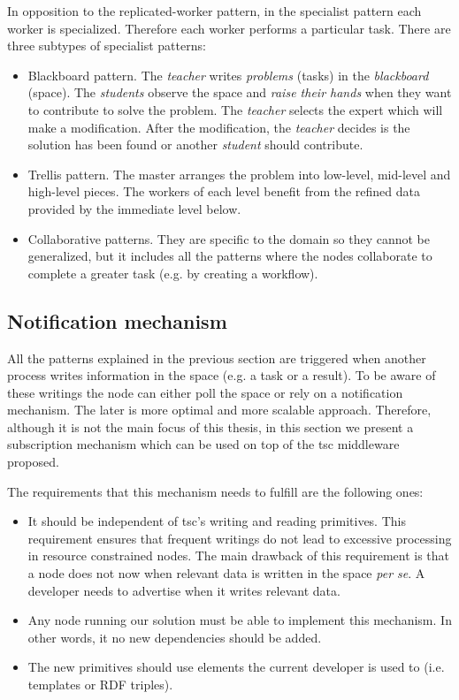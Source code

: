 In opposition to the replicated-worker pattern, in the specialist pattern each worker is specialized.
Therefore each worker performs a particular task.
There are three subtypes of specialist patterns:
\begin{itemize}
  \item Blackboard pattern.
	The \emph{teacher} writes \emph{problems} (tasks) in the \emph{blackboard} (space).
	The \emph{students} observe the space and \emph{raise their hands} when they want to contribute to solve the problem.
	The \emph{teacher} selects the expert which will make a modification.
	After the modification, the \emph{teacher} decides is the solution has been found or another \emph{student} should contribute.
  \item Trellis pattern.
	The master arranges the problem into low-level, mid-level and high-level pieces.
	The workers of each level benefit from the refined data provided by the immediate level below.
  \item Collaborative patterns.
	They are specific to the domain so they cannot be generalized, but it includes all the patterns where the nodes collaborate to complete a greater task
	(e.g. by creating a workflow).
\end{itemize}



\subsection{Notification mechanism}
\label{sec:notification}

All the patterns explained in the previous section are triggered when another process writes information in the space (e.g. a task or a result).
To be aware of these writings the node can either poll the space or rely on a notification mechanism.
The later is more optimal and more scalable approach.
Therefore, although it is not the main focus of this thesis, in this section we present a subscription mechanism which can be used on top of the \ac{tsc} middleware proposed.

The requirements that this mechanism needs to fulfill are the following ones:
\begin{itemize}
  \item It should be independent of \ac{tsc}'s writing and reading primitives.
	This requirement ensures that frequent writings do not lead to excessive processing in resource constrained nodes.
	The main drawback of this requirement is that a node does not now when relevant data is written in the space \emph{per se}.
	A developer needs to advertise when it writes relevant data.
  \item Any node running our solution must be able to implement this mechanism.
	In other words, it no new dependencies should be added.
  \item The new primitives should use elements the current developer is used to (i.e. templates or RDF triples).
\end{itemize}


